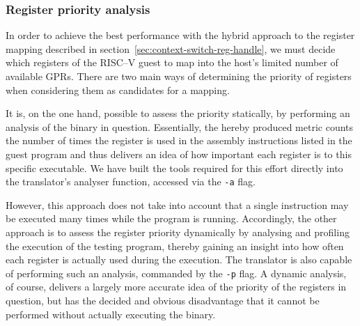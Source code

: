 \subsubsection{Register priority analysis}
In order to achieve the best performance with the hybrid approach to the register mapping described in section~\vref{sec:context-switch-reg-handle}, we must decide which registers of the RISC--V guest to map into the host's limited number of available GPRs.
There are two main ways of determining the priority of registers when considering them as candidates for a mapping.

It is, on the one hand, possible to assess the priority statically, by performing an analysis of the binary in question.
Essentially, the hereby produced metric counts the number of times the register is used in the assembly instructions listed in the guest program and thus delivers an idea of how important each register is to this specific executable.
We have built the tools required for this effort directly into the translator's analyser function, accessed via the \texttt{-a} flag.

However, this approach does not take into account that a single instruction may be executed many times while the program is running.
Accordingly, the other approach is to assess the register priority dynamically by analysing and profiling the execution of the testing program, thereby gaining an insight into how often each register is actually used during the execution.
The translator is also capable of performing such an analysis, commanded by the \texttt{-p} flag.
A dynamic analysis, of course, delivers a largely more accurate idea of the priority of the registers in question, but has the decided and obvious disadvantage that it cannot be performed without actually executing the binary.


